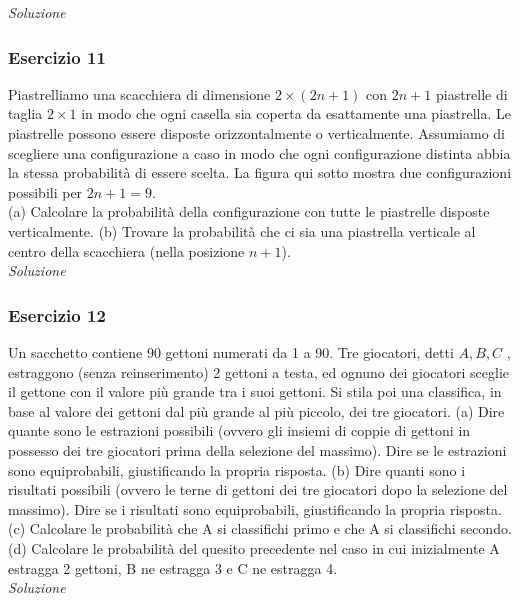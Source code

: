\textit{Soluzione} \quad 

\subsubsection{Esercizio 11}
Piastrelliamo una scacchiera di dimensione $2\times (2n+1)$ con $2n+1$ piastrelle di taglia $2\times1$ in modo che ogni casella sia coperta da esattamente una piastrella. Le piastrelle possono essere disposte orizzontalmente o verticalmente. Assumiamo di scegliere una configurazione a caso in modo che ogni configurazione distinta abbia la stessa probabilità di essere scelta. La figura qui sotto mostra due configurazioni possibili per $2n + 1 = 9$. \\
(a) Calcolare la probabilità della configurazione con tutte le piastrelle disposte verticalmente. (b) Trovare la probabilità che ci sia una piastrella verticale al centro della scacchiera (nella posizione
$n + 1$).
\\

\textit{Soluzione} \quad 

\subsubsection{Esercizio 12}
Un sacchetto contiene 90 gettoni numerati da 1 a 90. Tre giocatori, detti $A, B , C$ , estraggono (senza reinserimento) 2 gettoni a testa, ed ognuno dei giocatori sceglie il gettone con il valore più grande tra i suoi gettoni. Si stila poi una classifica, in base al valore dei gettoni dal più grande al più piccolo, dei tre giocatori.
(a) Dire quante sono le estrazioni possibili (ovvero gli insiemi di coppie di gettoni in possesso dei tre giocatori prima della selezione del massimo). Dire se le estrazioni sono equiprobabili, giustificando la propria risposta.
(b) Dire quanti sono i risultati possibili (ovvero le terne di gettoni dei tre giocatori dopo la selezione
del massimo). Dire se i risultati sono equiprobabili, giustificando la propria risposta.
(c) Calcolare le probabilità che A si classifichi primo e che A si classifichi secondo. (d) Calcolare le probabilità del quesito precedente nel caso in cui inizialmente A estragga 2 gettoni,
B ne estragga 3 e C ne estragga 4.
\\

\textit{Soluzione} \quad 
